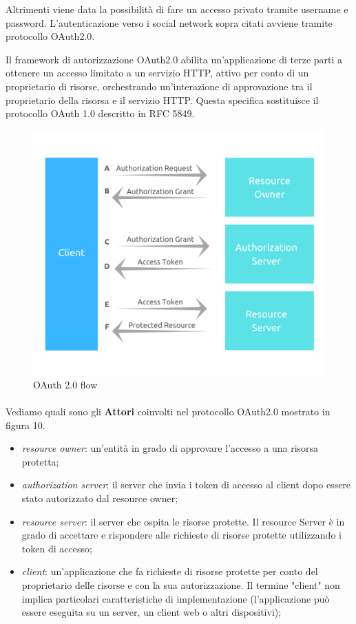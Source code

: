 Altrimenti viene data la possibilità di fare un accesso privato tramite username e password.
L'autenticazione verso i social network sopra citati avviene tramite protocollo OAuth2.0.

Il framework di autorizzazione OAuth2.0 abilita un'applicazione di terze parti a ottenere un accesso limitato a un servizio HTTP, attivo
per conto di un proprietario di risorse, orchestrando un'interazione di approvazione tra il proprietario della risorsa e il servizio HTTP.
Questa specifica sostituisce il protocollo OAuth 1.0 descritto in RFC 5849.

\begin{figure}[h!]
    \centering  
    \caption{OAuth 2.0 flow }
    \includegraphics[scale=0.60]{img/cap2/oauth20-2}
\end{figure}

\paragraph{}

Vediamo quali sono gli \textbf{Attori} coinvolti nel protocollo OAuth2.0 mostrato in figura 10.

\begin{itemize}
\item \textit{resource owner}: un'entità in grado di approvare l'accesso a una risorsa protetta;
\item \textit{authorization server}: il server che invia i token di accesso al client dopo essere stato autorizzato
dal resource owner;
\item \textit{resource server}: il server che ospita le risorse protette. Il resource Server è in grado di accettare
e rispondere alle richieste di risorse protette utilizzando i token di accesso;
\item \textit{client}: un'applicazione che fa richieste di risorse protette per conto del
proprietario delle risorse e con la sua autorizzazione. Il termine "client"
non implica particolari caratteristiche di implementazione (l'applicazione può essere eseguita
su un server, un client web o altri dispositivi);
\end{itemize}


